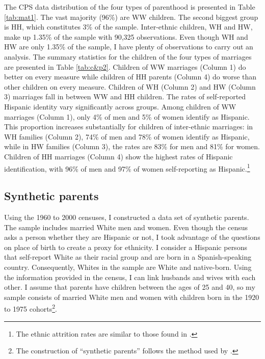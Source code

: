 The CPS data distribution of the four types of parenthood is presented in Table \ref{tab:mat1}. The vast majority (96\%) are WW children. The second biggest group is HH, which constitutes 3\% of the sample. Inter-ethnic children, WH and HW, make up 1.35\% of the sample with 90,325 observations. Even though WH and HW are only 1.35\% of the sample, I have plenty of observations to carry out an analysis. The summary statistics for the children of the four types of marriages are presented in Table \ref{tab:c&p2}. Children of WW marriages (Column 1) do better on every measure while children of HH parents (Column 4) do worse than other children on every measure. Children of WH (Column 2) and HW (Column 3) marriages fall in between WW and HH children. The rates of self-reported Hispanic identity vary significantly across groups. Among children of WW marriages (Column 1), only 4\% of men and 5\% of women identify as Hispanic. This proportion increases substantially for children of inter-ethnic marriages: in WH families (Column 2), 74\% of men and 78\% of women identify as Hispanic, while in HW families (Column 3), the rates are 83\% for men and 81\% for women. Children of HH marriages (Column 4) show the highest rates of Hispanic identification, with 96\% of men and 97\% of women self-reporting as Hispanic.\footnote{The ethnic attrition rates are similar to those found in \textcite{antmanEthnicAttritionObserved2016,antmanEthnicAttritionAssimilation2020, hadah2024effect}.}
 
\subsection{Synthetic parents}

Using the 1960 to 2000 censuses, I constructed a data set of synthetic parents. The sample includes married White men and women. Even though the census asks a person whether they are Hispanic or not, I took advantage of the questions on place of birth to create a proxy for ethnicity. I consider a Hispanic persons that self-report White as their racial group and are born in a Spanish-speaking country. Consequently, Whites in the sample are White and native-born. Using the information provided in the census, I can link husbands and wives with each other. I assume that parents have children between the ages of 25 and 40, so my sample consists of married White men and women with children born in the 1920 to 1975 cohorts\footnote{The construction of ``synthetic parents'' follows the method used by \textcite{rubinstein2014pride}.}.

